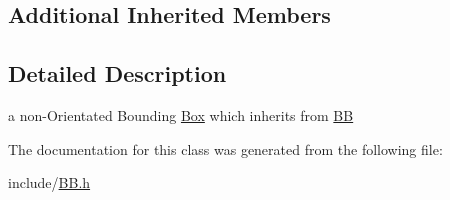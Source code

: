 \subsection*{Additional Inherited Members}


\subsection{Detailed Description}
a non-\/\+Orientated Bounding \hyperlink{class_box}{Box} which inherits from \hyperlink{class_b_b}{B\+B} 

The documentation for this class was generated from the following file\+:\begin{DoxyCompactItemize}
\item 
include/\hyperlink{_b_b_8h}{B\+B.\+h}\end{DoxyCompactItemize}
